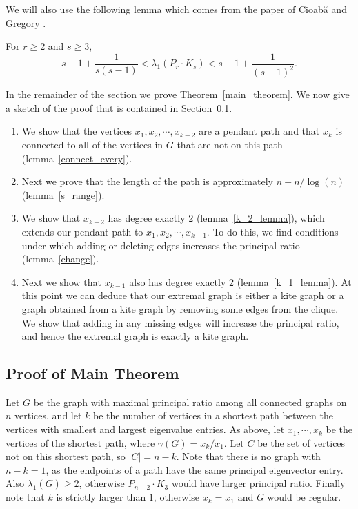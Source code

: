 We will also use the following lemma which comes from the
paper of Cioab\u{a} and Gregory \cite{CioabaGregory2007}.

\begin{lemma}\label{kite_lambda}
  For $r \geq 2$ and $s \geq 3$,
   \[ s - 1 + \frac{1}{s(s-1)} < \lambda_1(P_r \cdot K_s) < s - 1 + \frac{1}{(s-1)^2} . \]
\end{lemma}

In the remainder of the section  we prove Theorem~\ref{main_theorem}.
We now give a sketch of the proof that is contained in Section~\ref{sec_proof}.

\begin{enumerate}
 \item We show that the vertices $x_1, x_2, \cdots, x_{k-2}$ are
   a pendant path and that $x_k$ is connected to all of the vertices
   in $G$ that are not on this path (lemma~\ref{connect_every}).
 \item Next we prove that the length of the path is approximately
   $n - n/\log(n)$ (lemma~\ref{s_range}).
 \item We show that $x_{k-2}$ has degree exactly $2$ (lemma~\ref{k_2_lemma}), which
   extends our pendant path to $x_1, x_2, \cdots, x_{k-1}$.
   To do this, we find conditions under which adding or deleting
   edges increases the principal ratio (lemma~\ref{change}).
 \item Next we show that $x_{k-1}$ also has degree exactly $2$ (lemma~\ref{k_1_lemma}).
   At this point we can deduce that our extremal graph is either
   a kite graph or a graph obtained from a kite graph
   by removing some edges from the clique.  We show that
   adding in any missing edges will increase the principal ratio,
   and hence the extremal graph is exactly a kite graph.
   
\end{enumerate}

\subsection{Proof of Main Theorem}\label{sec_proof}



Let $G$ be the graph with maximal principal ratio among all connected
graphs on $n$ vertices, and let $k$ be the number of vertices in a
shortest path between the vertices with smallest and largest eigenvalue
entries. As above, let $x_1,\cdots, x_k$ be the vertices of the shortest path, where $\gamma(G) = x_k / x_1$.  Let $C$ be the set of vertices not on this shortest
path, so $|C| = n-k$.  Note that there is no graph with $n-k=1$, as the endpoints of a path have the same principal eigenvector entry.  Also
$\lambda_1(G) \geq 2$, otherwise $P_{n-2} \cdot K_3$ would have larger
principal ratio.  Finally note that $k$ is strictly larger than $1$,
otherwise $x_k = x_1$ and $G$ would be regular.


